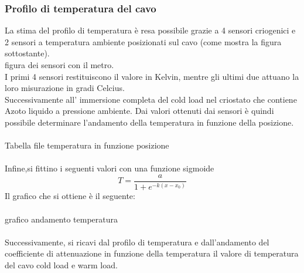\subsubsection{Profilo di temperatura del cavo}

La stima del profilo di temperatura è resa possibile grazie a 4 sensori criogenici e 2 sensori a temperatura ambiente posizionati sul cavo (come mostra la figura sottostante). 
\\
figura dei sensori con il metro.
\\
I primi 4 sensori restituiscono il valore in Kelvin, mentre gli ultimi due attuano la loro misurazione in gradi Celcius.\\
Successivamente all' immersione completa del cold load nel criostato che contiene Azoto liquido a pressione ambiente. Dai valori ottenuti dai sensori è quindi possibile determinare l'andamento della temperatura in funzione della posizione. 
\\\\
Tabella file temperatura in funzione posizione
\\\\
Infine,si fittino i seguenti valori con una funzione sigmoide
\begin{equation}
T= \dfrac{a}{1+e^{-k(x-x_{0})}}
\end{equation}
Il grafico che si ottiene è il seguente:
\\\\
grafico andamento temperatura
\\\\
Successivamente, si ricavi dal profilo di  temperatura e dall'andamento del coefficiente di attenuazione in funzione della temperatura il valore di temperatura del cavo cold load e warm load.

